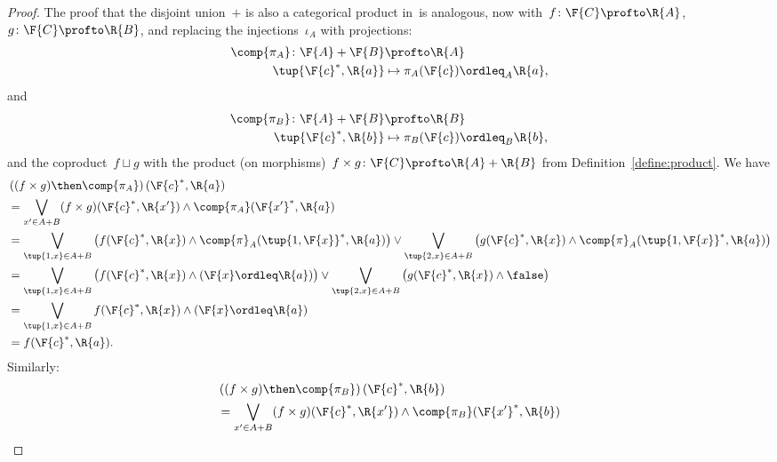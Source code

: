 \begin{proof}
  The proof that the disjoint union~$+$ is also a categorical product in~\DP is analogous, now with~$f \colon \F{C} \profto \R{A}$,~$g \colon \F{C} \profto \R{B}$, and replacing the injections~$\iota_A$ with projections:
  \begin{equation}
    \begin{aligned}
      \comp{\pi_A} \colon \F{A}+\F{B} &\profto \R{A}\\
      \tup{\F{c}^*,\R{a}}&\mapsto \pi_A(\F{c})\ordleq_A \R{a},
    \end{aligned}
  \end{equation}
  and
  \begin{equation}
    \begin{aligned}
      \comp{\pi_B} \colon \F{A}+\F{B} &\profto \R{B}\\
      \tup{\F{c}^*,\R{b}}&\mapsto \pi_B(\F{c})\ordleq_B \R{b},
    \end{aligned}
  \end{equation}
  and the coproduct~$f \sqcup g$ with the product (on morphisms)~$f \times g \colon \F{C} \profto \R{A} + \R{B}$ from Definition~\ref{define:product}. We have
  \begin{equation}
    \begin{aligned}
      &\left((f\times g)\then \comp{\pi_A}\right)(\F{c}^*,\R{a})\\
      &=\bigvee_{x'\in A+B} (f\times g)(\F{c}^*,\R{x'}) \wedge \comp{\pi_A}(\F{x'}^*,\R{a})\\
      &=\bigvee_{\tup{1,x}\in A+B}\left( f(\F{c}^*,\R{x}) \wedge \comp{\pi}_A(\tup{1,\F{x}}^*,\R{a})\right) \vee
      \bigvee_{\tup{2,x}\in A+B}\left( g(\F{c}^*,\R{x}) \wedge \comp{\pi}_A(\tup{1,\F{x}}^*,\R{a})\right)\\
      &=\bigvee_{\tup{1,x}\in A+B}\left( f(\F{c}^*,\R{x}) \wedge (\F{x}\ordleq \R{a})\right) \vee
      \bigvee_{\tup{2,x}\in A+B}\left( g(\F{c}^*,\R{x}) \wedge \false \right)\\
      &=\bigvee_{\tup{1,x}\in A+B} f(\F{c}^*,\R{x}) \wedge (\F{x}\ordleq \R{a})\\
      &=f(\F{c}^*,\R{a}).
    \end{aligned}
  \end{equation}
  Similarly:
  \begin{equation}
    \begin{aligned}
      &\left((f\times g)\then \comp{\pi_B}\right)(\F{c}^*,\R{b})\\
      &=\bigvee_{x'\in A+B} (f\times g)(\F{c}^*,\R{x'}) \wedge \comp{\pi_B}(\F{x'}^*,\R{b})\\

\end{aligned}
\end{equation}
\end{proof}
